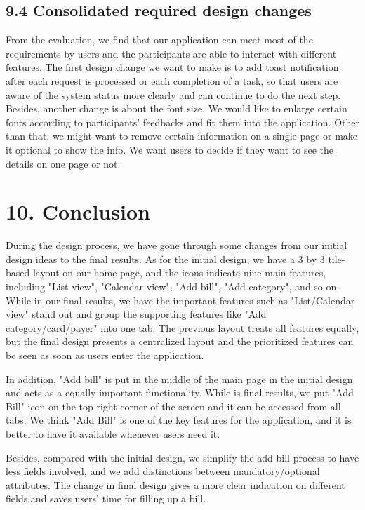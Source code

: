 \documentclass{sigchi}
\begin{document}
\subsection{9.4 Consolidated required design changes}

From the evaluation, we find that our application can meet most of the requirements by users and the participants are able to interact with different features. The first design change we want to make is to add toast notification after each request is processed or each completion of a task, so that users are aware of the system status more clearly and can continue to do the next step. Besides, another change is about the font size. We would like to enlarge certain fonts according to participants' feedbacks and fit them into the application. Other than that, we might want to remove certain information on a single page or make it optional to show the info. We want users to decide if they want to see the details on one page or not. 

\section{10. Conclusion}

During the design process, we have gone through some changes from our initial design ideas to the final results. As for the initial design, we have a 3 by 3 tile-based layout on our home page, and the icons indicate nine main features, including "List view", "Calendar view", "Add bill", "Add category", and so on. While in our final results, we have the important features such as "List/Calendar view" stand out and group the supporting features like "Add category/card/payer" into one tab. The previous layout treats all features equally, but the final design presents a centralized layout and the prioritized features can be seen as soon as users enter the application. 

In addition, "Add bill" is put in the middle of the main page in the initial design and acts as a equally important functionality. While is final results, we put "Add Bill" icon on the top right corner of the screen and it can be accessed from all tabs. We think "Add Bill" is one of the key features for the application, and it is better to have it available whenever users need it.

Besides, compared with the initial design, we simplify the add bill process to have less fields involved, and we add distinctions between mandatory/optional attributes. The change in final design gives a more clear indication on different fields and saves users' time for filling up a bill. 
\end{document}
